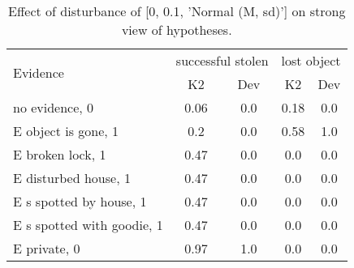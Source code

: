 \begin{table}\begin{tabular}{l|cc|cc}\toprule\multirow{2}{*}{Evidence} & \multicolumn{2}{c}{successful stolen}& \multicolumn{2}{c}{lost object}\\& {K2} & {Dev}& {K2} & {Dev}\\\midrule
no evidence, 0 & \cellcolor{Bittersweet}0.06&\cellcolor{Bittersweet}0.0&\cellcolor{Bittersweet}0.18&\cellcolor{Bittersweet}0.0\\E object is gone, 1 & \cellcolor{Bittersweet}0.2&\cellcolor{Bittersweet}0.0&0.58&1.0\\E broken lock, 1 & 0.47&0.0&\cellcolor{Bittersweet}0.0&\cellcolor{Bittersweet}0.0\\E disturbed house, 1 & 0.47&0.0&\cellcolor{Bittersweet}0.0&\cellcolor{Bittersweet}0.0\\E s spotted by house, 1 & 0.47&0.0&\cellcolor{Bittersweet}0.0&\cellcolor{Bittersweet}0.0\\E s spotted with goodie, 1 & 0.47&0.0&\cellcolor{Bittersweet}0.0&\cellcolor{Bittersweet}0.0\\E private, 0 & \cellcolor{Bittersweet}0.97&\cellcolor{Bittersweet}1.0&\cellcolor{Bittersweet}0.0&\cellcolor{Bittersweet}0.0\\\bottomrule\end{tabular}\caption{Effect of disturbance of [0, 0.1, 'Normal (M, sd)'] on strong view of hypotheses.}\end{table}